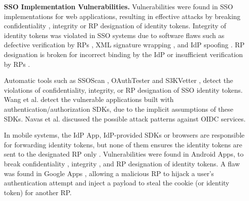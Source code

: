 \vspace{0.5mm}
\noindent\textbf{SSO Implementation Vulnerabilities.}
Vulnerabilities were found in SSO implementations for web applications,
    resulting in effective attacks %
     by breaking confidentiality \cite{WangCW12,ccsSunB12,ArmandoCCCPS13,DiscoveringJCS,dimvaLiM16}, integrity \cite{WangCW12,SomorovskyMSKJ12,WangZLG16,MainkaMS16, MainkaMSW17,dimvaLiM16} or RP designation \cite{WangZLG16,MainkaMS16,MainkaMSW17,YangLCZ18,dimvaLiM16} of identity tokens.
Integrity of identity tokens was violated in SSO systems  %
due to software flaws such as
 defective verification by RPs \cite{WangCW12,WangZLG16,MainkaMSW17}, XML signature wrapping \cite{SomorovskyMSKJ12}, and IdP spoofing \cite{MainkaMS16,MainkaMSW17}.
RP designation is broken
    for incorrect binding by the IdP \cite{YangLCZ18,WangZLG16} or insufficient verification by RPs \cite{MainkaMS16,MainkaMSW17,YangLCZ18}.

Automatic tools such as SSOScan \cite{ZhouE14}, OAuthTester \cite{YangLLZH16} and S3KVetter \cite{YangLCZ18},
detect the violations of confidentiality, integrity, or RP designation of SSO identity tokens.
Wang et al. \cite{ExplicatingSDK} detect the vulnerable applications
    built with authentication/authorization SDKs,
     due to the implicit assumptions of these SDKs.
Navas et al. \cite{NavasB19} discussed the possible attack patterns against OIDC services.

In mobile systems,
the IdP App,
    IdP-provided SDKs %
     or browsers
         are responsible for forwarding identity tokens, %
but none of them ensures the identity tokens are sent to the designated RP only \cite{ChenPCTKT14,WangZLLYLG15}.
Vulnerabilities were found in Android Apps,
    to break confidentiality \cite{ChenPCTKT14,WangZLLYLG15,YangLS17,ShiWL19}, integrity \cite{ChenPCTKT14,YangLS17}, and RP designation \cite{ChenPCTKT14,ShiWL19} of identity tokens.
A flaw was found in Google Apps \cite{ArmandoCCCPS13}, allowing a malicious RP to hijack a user's authentication attempt and inject a payload to steal the cookie (or identity token) for another RP.

